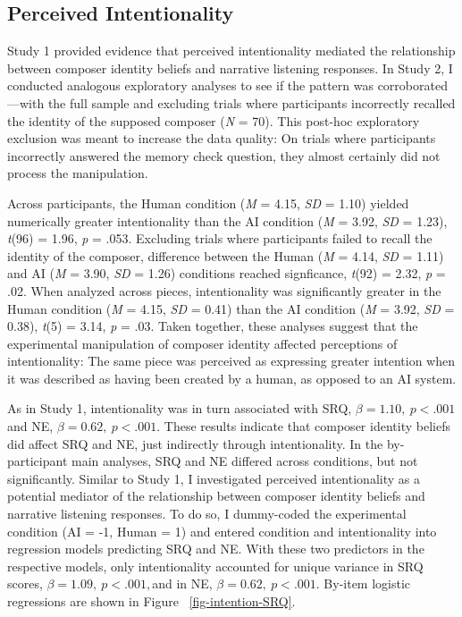 \documentclass[12pt,twoside]{reedthesis}
\begin{document}
\subsection*{Perceived Intentionality}
Study 1 provided evidence that perceived intentionality mediated the relationship between composer identity beliefs and narrative listening responses. In Study 2, I conducted analogous exploratory analyses to see if the pattern was corroborated—with the full sample and excluding trials where participants incorrectly recalled the identity of the supposed composer (\emph{N} = 70). This post-hoc exploratory exclusion was meant to increase the data quality: On trials where participants incorrectly answered the memory check question, they almost certainly did not process the manipulation.

Across participants, the Human condition (\emph{M} = 4.15, \emph{SD} = 1.10) yielded numerically greater intentionality than the AI condition (\emph{M} = 3.92, \emph{SD} = 1.23), \emph{t}(96) = 1.96, \emph{p} = .053. Excluding trials where participants failed to recall the identity of the composer, difference between the Human (\emph{M} = 4.14, \emph{SD} = 1.11) and AI (\emph{M} = 3.90, \emph{SD} = 1.26) conditions reached signficance, \emph{t}(92) = 2.32, \emph{p} = .02. When analyzed across pieces, intentionality was significantly greater in the Human condition (\emph{M} = 4.15, \emph{SD}  = 0.41) than the AI condition (\emph{M} = 3.92, \emph{SD} = 0.38), \emph{t}(5) = 3.14, \emph{p} = .03. Taken together, these analyses suggest that the experimental manipulation of composer identity affected perceptions of intentionality: The same piece was perceived as expressing greater intention when it was described as having been created by a human, as opposed to an AI system. 

As in Study 1, intentionality was in turn associated with SRQ, $\beta = 1.10, \:p < .001$ and NE, $ \beta = 0.62, \:p < .001$. These results indicate that composer identity beliefs did affect SRQ and NE, just indirectly through intentionality.
In the by-participant main analyses, SRQ and NE differed across conditions, but not significantly. Similar to Study 1, I investigated perceived intentionality as a potential mediator of the relationship between composer identity beliefs and narrative listening responses. To do so, I dummy-coded the experimental condition (AI = -1, Human = 1) and entered condition and intentionality into regression models predicting SRQ and NE. With these two predictors in the respective models, only intentionality accounted for unique variance in SRQ scores, $\beta = 1.09, \:p < .001, $and in NE, $ \beta = 0.62, \:p < .001$. By-item logistic regressions are shown in Figure ~\ref*{fig-intention-SRQ}.
\end{document}
